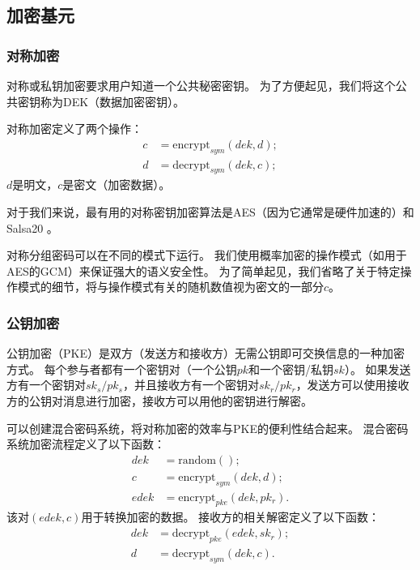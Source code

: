 \documentclass[longbibliography,nofootinbib]{revtex4-1}
\begin{document}
\subsection{加密基元}

\subsubsection{对称加密}

对称或私钥加密要求用户知道一个公共秘密密钥。
为了方便起见，我们将这个公共密钥称为DEK（数据加密密钥）。

对称加密定义了两个操作：
\begin{align}
    c &= \text{encrypt}_{sym}(dek, d);\\
    d &= \text{decrypt}_{sym}(dek, c);
\end{align}
$d$是明文，$c$是密文（加密数据）。

对于我们来说，最有用的对称密钥加密算法是AES（因为它通常是硬件加速的）\cite{wiki:aes}和Salsa20 \cite{wiki:salsa20}。

对称分组密码可以在不同的模式下运行。
我们使用概率加密的操作模式（如用于AES的GCM）来保证强大的语义安全性。
为了简单起见，我们省略了关于特定操作模式的细节，将与操作模式有关的随机数值视为密文的一部分$c$。

\subsubsection{公钥加密}

公钥加密（PKE）是双方（发送方和接收方）无需公钥即可交换信息的一种加密方式。
每个参与者都有一个密钥对（一个公钥$pk$和一个密钥/私钥$sk$）。
如果发送方有一个密钥对$sk_s/pk_s$，并且接收方有一个密钥对$sk_r/pk_r$，发送方可以使用接收方的公钥对消息进行加密，接收方可以用他的密钥进行解密。

可以创建混合密码系统，将对称加密的效率与PKE的便利性结合起来。
混合密码系统加密流程定义了以下函数：
\begin{align}
    dek &= \text{random}();\\
    c &= \text{encrypt}_{sym}(dek, d);\\
    edek &= \text{encrypt}_{pke}(dek, pk_r).
\end{align}
该对$(edek,c)$用于转换加密的数据。
接收方的相关解密定义了以下函数：
\begin{align}
    dek &= \text{decrypt}_{pke}(edek, sk_r);\\
    d &= \text{decrypt}_{sym}(dek, c).
\end{align}
\end{document}
